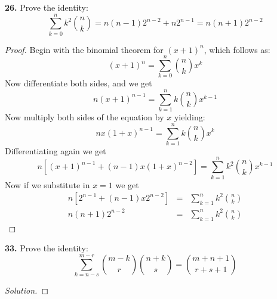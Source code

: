 \documentclass[12pt]{amsart}
\newenvironment{solution}
{\begin{proof}[Solution]}
{\end{proof}}
\begin{document}
\begin{onehalfspace}
        \textbf{26.} Prove the identity:
        \begin{displaymath}
            \sum_{k=0}^n k^2\binom{n}{k} = n(n-1)2^{n-2} + n2^{n-1} = n(n+1)2^{n-2}
        \end{displaymath}
        \begin{proof}
            Begin with the binomial theorem for $(x+1)^n$, which follows as:
            \begin{displaymath}
                (x+1)^n = \sum_{k=0}^n \binom{n}{k}x^k
            \end{displaymath}
            Now differentiate both sides, and we get
            \begin{displaymath}
                n(x+1)^{n-1} = \sum_{k=1}^n k\binom{n}{k}x^{k-1}
            \end{displaymath}
            Now multiply both sides of the equation by $x$ yielding:
            \begin{displaymath}
                nx(1+x)^{n-1} = \sum_{k=1}^n k\binom{n}{k}x^{k}
            \end{displaymath}
            Differentiating again we get
            \begin{displaymath}
                n[(x+1)^{n-1} + (n-1)x(1+x)^{n-2}] = \sum_{k=1}^n k^2\binom{n}{k}x^{k-1}
            \end{displaymath}
            Now if we substitute in $x=1$ we get
            \begin{eqnarray*}
                n[2^{n-1} + (n-1)x2^{n-2}] & = & \sum_{k=1}^n k^2\binom{n}{k} \\
                n(n+1)2^{n-2} & = & \sum_{k=1}^n k^2\binom{n}{k}
            \end{eqnarray*}
        \end{proof}

        \textbf{33.} Prove the identity:
        \begin{displaymath}
            \sum_{k=n-s}^{m-r} \binom{m-k}{r}\binom{n+k}{s} = \binom{m+n+1}{r+s+1}
        \end{displaymath}
        \begin{solution}
        \end{solution}
    \end{onehalfspace}
\end{document}
